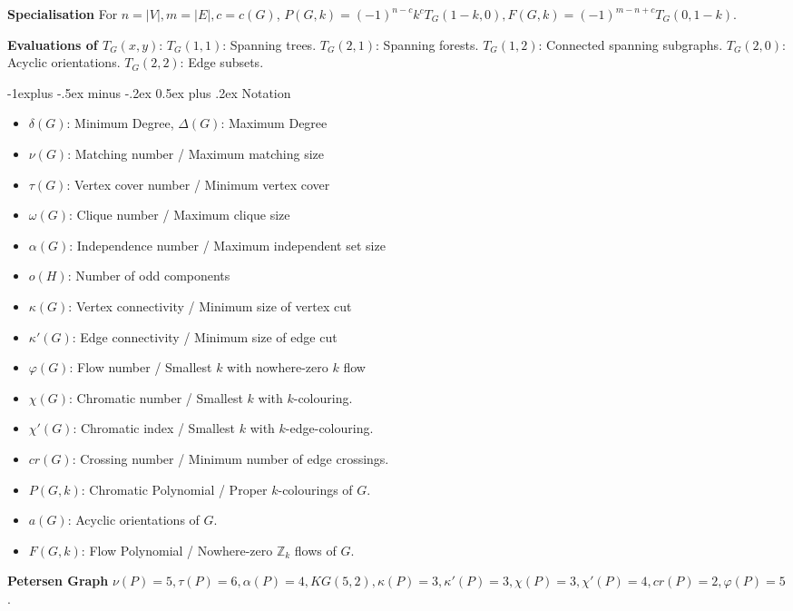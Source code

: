 \documentclass[10pt, landscape]{article}
\makeatletter
\renewcommand{\section}{\@startsection{section}{1}{0mm}%
                                {-1ex plus -.5ex minus -.2ex}%
                                {0.5ex plus .2ex}%
                                {\normalfont\large\bfseries}}
\renewcommand{\section}{\@startsection{section}{2}{0mm}%
                                {-1explus -.5ex minus -.2ex}%
                                {0.5ex plus .2ex}%
                                {\normalfont\normalsize\bfseries}}
\makeatother
\begin{document}
\begin{multicols*}{3}
\textbf{Specialisation} For $n=|V|, m=|E|, c=c(G)$, $P(G,k)=(-1)^{n-c}k^c T_G(1-k, 0), F(G,k)=(-1)^{m-n+c}T_G(0, 1-k)$.

\textbf{Evaluations of $T_G(x, y)$}: $T_G(1,1)$: Spanning trees. $T_G(2,1)$: Spanning forests. $T_G(1,2)$: Connected spanning subgraphs. $T_G(2,0)$: Acyclic orientations. $T_G(2,2)$: Edge subsets.

\section{Notation}
\begin{itemize}
    \item \textbf{$\delta(G)$}: Minimum Degree, \textbf{$\Delta(G)$}: Maximum Degree
    \item \textbf{$\nu(G)$}: Matching number / Maximum matching size
    \item \textbf{$\tau(G)$}: Vertex cover number / Minimum vertex cover
    \item \textbf{$\omega(G)$}: Clique number / Maximum clique size
    \item \textbf{$\alpha(G)$}: Independence number / Maximum independent set size
    \item \textbf{$o(H)$}: Number of odd components
    \item \textbf{$\kappa(G)$}: Vertex connectivity / Minimum size of vertex cut
    \item \textbf{$\kappa'(G)$}: Edge connectivity / Minimum size of edge cut
    \item \textbf{$\varphi(G)$}: Flow number / Smallest $k$ with nowhere-zero $k$ flow
    \item \textbf{$\chi(G)$}: Chromatic number / Smallest $k$ with $k$-colouring.
    \item \textbf{$\chi'(G)$}: Chromatic index / Smallest $k$ with $k$-edge-colouring.
    \item \textbf{$cr(G)$}: Crossing number / Minimum number of edge crossings.
    \item \textbf{$P(G, k)$}: Chromatic Polynomial / Proper $k$-colourings of $G$.
    \item \textbf{$a(G)$}: Acyclic orientations of $G$.
    \item \textbf{$F(G, k)$}: Flow Polynomial / Nowhere-zero $\mathbb{Z}_k$ flows of $G$.
\end{itemize}

\textbf{Petersen Graph} $\nu(P)=5, \tau(P)=6, \alpha(P)=4, KG(5, 2), \kappa(P) = 3, \kappa'(P)=3,\chi(P)=3, \chi'(P)=4, cr(P)=2, \varphi(P)=5$.


\end{multicols*}
\end{document}

